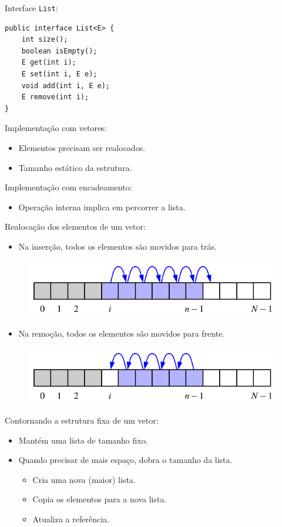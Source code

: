 Interface \texttt{List}:
\begin{verbatim}
public interface List<E> {
	int size();
	boolean isEmpty();
	E get(int i);
	E set(int i, E e);
	void add(int i, E e);
	E remove(int i);
}
\end{verbatim}

\medskip


Implementação com vetores:
\begin{itemize}
	\item Elementos precisam ser realocados.
	\item Tamanho estático da estrutura.
\end{itemize}

Implementação com encadeamento:
\begin{itemize}
	\item Operação interna implica em percorrer a lista.
\end{itemize}

Realocação dos elementos de um vetor:

\begin{itemize}
	\color{redtext}
	\item Na inserção, todos os elementos são movidos para trás.
\end{itemize}

\begin{figure}[H]
	\centering
	\includegraphics[width=0.7\linewidth]{img/figure-7-1a}
\end{figure}

\begin{itemize}
	\color{redtext}
	\item Na remoção, todos os elementos são movidos para frente.
\end{itemize}

\begin{figure}[H]
	\centering
	\includegraphics[width=0.7\linewidth]{img/figure-7-1b}
\end{figure}

Contornando a estrutura fixa de um vetor:
\begin{itemize}
	\item Mantém uma lista de tamanho fixo.
	\item Quando precisar de mais espaço, dobra o tamanho da lista.
	\begin{itemize}
		\item Cria uma nova (maior) lista.
		\item Copia os elementos para a nova lista.
		\item Atualiza a referência.
	\end{itemize}
\end{itemize}

